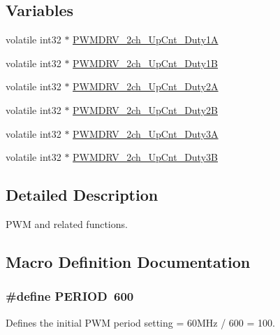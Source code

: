 \subsection*{Variables}
\begin{DoxyCompactItemize}
\item 
volatile int32 $\ast$ \hyperlink{a00025_a8a02650c6afb411447157faf0e90a7b2}{P\-W\-M\-D\-R\-V\-\_\-2ch\-\_\-\-Up\-Cnt\-\_\-\-Duty1\-A}
\item 
volatile int32 $\ast$ \hyperlink{a00025_a23767edc2ebfabc9336684185a4f2d84}{P\-W\-M\-D\-R\-V\-\_\-2ch\-\_\-\-Up\-Cnt\-\_\-\-Duty1\-B}
\item 
volatile int32 $\ast$ \hyperlink{a00025_acc76d5ffc745e63de05baa242bb3d16f}{P\-W\-M\-D\-R\-V\-\_\-2ch\-\_\-\-Up\-Cnt\-\_\-\-Duty2\-A}
\item 
volatile int32 $\ast$ \hyperlink{a00025_a3215b15b28994e0840d64200f09cbfb0}{P\-W\-M\-D\-R\-V\-\_\-2ch\-\_\-\-Up\-Cnt\-\_\-\-Duty2\-B}
\item 
volatile int32 $\ast$ \hyperlink{a00025_a86962b3c7a5a851d9ddce3301a9db727}{P\-W\-M\-D\-R\-V\-\_\-2ch\-\_\-\-Up\-Cnt\-\_\-\-Duty3\-A}
\item 
volatile int32 $\ast$ \hyperlink{a00025_a9550c95286e784256c9f12906ff5a407}{P\-W\-M\-D\-R\-V\-\_\-2ch\-\_\-\-Up\-Cnt\-\_\-\-Duty3\-B}
\end{DoxyCompactItemize}


\subsection{Detailed Description}
P\-W\-M and related functions. 

\subsection{Macro Definition Documentation}
\hypertarget{a00025_af281425e62298bac2df0fbe8690a4844}{
\subsubsection[{P\-E\-R\-I\-O\-D}]{\setlength{\rightskip}{0pt plus 5cm}\#define P\-E\-R\-I\-O\-D~600}}\label{a00025_af281425e62298bac2df0fbe8690a4844}
Defines the initial P\-W\-M period setting = 60\-M\-Hz / 600 = 100. 

